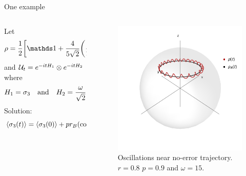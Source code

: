 \begin{frame}{One example}
    \begin{columns}
        \begin{column}{0.5\textwidth}
            Let
            \begin{equation*}
                \rho=\frac{1}{2}\qty[\Id+\frac{4}{5\sqrt{2}}\qty(\frac{1}{2}\pauli{1}+\frac{1}{2}\pauli{2}+\pauli{3})],
            \end{equation*}
            and $\mathcal{U}_{t}=e^{-itH_{1}}\otimes e^{-itH_{2}}$ where
                \begin{align*}
                    H_{1}=\sigma_{3} & & \text{and} & & H_{2}=\frac{\omega}{\sqrt{2}}(\sigma_{1}-\sigma_{2}).
                \end{align*}
            Solution:
            \begin{equation*}
                \expval{\sigma_{3}(t)}=\expval{\sigma_{3}(0)}+pr_{B}(\cos(2\omega t)-1).
            \end{equation*}
        \end{column}
        \begin{column}{0.5\textwidth}
            \begin{figure}[h!]
                \includegraphics[width=0.7\columnwidth]{figures/U1xU2_H1=(sz)_H2=15(sx-sy)_z=0.8_p=0.9_far.png}%
                \caption{Oscillations near no-error trajectory.\\ $r=0.8$ $p=0.9$ and $\omega=15$. }
            \end{figure}
        \end{column}
    \end{columns}
\end{frame}

